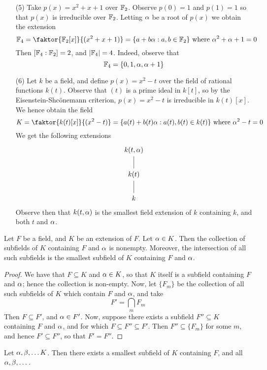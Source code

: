 \begin{example}
\begin{enumerate}
    \item[(5)] Take $p(x)=x^2+x+1$ over $\mathbb{F}_2$. Observe $p(0)=1$ and
      $p(1)=1$ so that $p(x)$ is irreducible over $\mathbb{F}_2$. Letting $\alpha$
      be a root of  $p(x)$ we obtain the extension
      \begin{equation*}
        \F_4=\faktor{\F_2[x]}{(x^2+x+1)}=\{a+b\a : a,b \in \F_2\}
        \text{ where } \a^2+\a+1=0
      \end{equation*}
      Then $[\mathbb{F}_4:\mathbb{F}_2]=2$, and $|\mathbb{F}_4|=4$. Indeed, observe that
      \begin{equation*}
        \mathbb{F}_4=\{0, 1, \alpha, \alpha+1\}
      \end{equation*}

    \item[(6)] Let $k$ be a field, and define $p(x)=x^2-t$ over the
      field of rational functions $k(t)$. Observe that $(t)$ is a
      prime ideal in $k[t]$, so by the Eisenstein-Shc\"onemann
      criterion, $p(x)=x^2-t$ is irreducible in $k(t)[x]$. We hence
      obtain the field
      \begin{equation*}
        K=\faktor{k(t)[x]}{(x^2-t)}=\{a(t)+b(t)\a : a(t),b(t) \in
        k(t)\} \text{ where }  \a^2-t=0
      \end{equation*}
      We get the following extensions
      \[\begin{tikzcd}
        {k(t,\a)} \\
        {k(t)} \\
        k
        \arrow[no head, from=2-1, to=1-1]
        \arrow[no head, from=3-1, to=2-1]
      \end{tikzcd}\]
      Observe then that $k(t,\alpha)$ is the smallest field extension of
      $k$ containing $k$, and both $t$ and $\alpha$.
  \end{enumerate}
\end{example}

\begin{proposition}\label{proposition_8.1.7}
  Let $F$ be a field, and $K$ be an extension of $F$. Let  $\alpha \in K$.
  Then the collection of subfields of $K$ containing $F$ and $\alpha$ is
  nonempty. Moreover, the intersection of all such subfields is the
  smallest subfield of $K$ containing $F$ and $\alpha$.
\end{proposition}
\begin{proof}
  We have that $F \subseteq K$ and $\alpha \in K$, so that $K$ itself is a
  subfield containing $F$ and $\alpha$; hence the collection is non-empty.
  Now, let $\{F_m\}$ be the collection of all such subfields of $K$
  which contain  $F$ and  $\alpha$, and take
  \begin{equation*}
    F'=\bigcap_{m}{F_m}
  \end{equation*}
  Then $F \subseteq F'$, and $\alpha \in F'$. Now, suppose there exists a
  subfield $F'' \subseteq K$ containing $F$ and $\alpha$, and for which
  $F \subseteq F'' \subseteq F'$. Then $F'' \subseteq \{F_m\}$ for
  some $m$, and hence $F' \subseteq F''$, so that $F'=F''$.
\end{proof}
\begin{corollary}
  Let $\alpha,\beta, \dots K$. Then there exists a smallest subfield of $K$
  containing $F$, and all $\alpha,\beta, \dots$.
\end{corollary}

